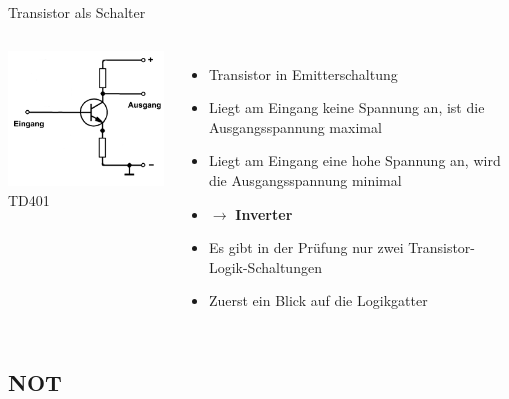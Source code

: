 \begin{frame}{Transistor als Schalter}
  \begin{columns}
      \includegraphics[width=\textwidth,height=.8\textheight,keepaspectratio]{a14/td401.png}\\
      {\tiny TD401 \hyperlink{refs}{\cite{bna}}}\\
      \pause
      \begin{itemize}
        \item Transistor in Emitterschaltung
        \item Liegt am Eingang keine Spannung an, ist die Ausgangsspannung maximal
        \item Liegt am Eingang eine hohe Spannung an, wird die Ausgangsspannung minimal
        \item $\rightarrow$ \textbf{Inverter}
          \pause
        \item Es gibt in der Prüfung nur zwei Transistor-Logik-Schaltungen
        \item Zuerst ein Blick auf die Logikgatter
      \end{itemize}
  \end{columns}
\end{frame}

\subsection{NOT}


